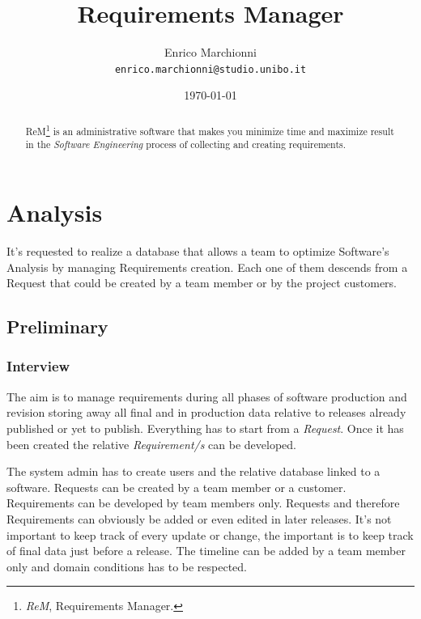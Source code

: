 \documentclass[12pt, a4paper]{report}
\title{
    Requirements Manager
}
\author{
    Enrico Marchionni\\
    \texttt{enrico.marchionni@studio.unibo.it}
}
\date{\today}
\begin{document}
\maketitle

\begin{abstract}

ReM\footnote{\emph{ReM}, Requirements Manager.} is an administrative software that makes you minimize time and maximize result in
the \emph{Software Engineering} process of collecting and creating requirements.

\end{abstract}

\tableofcontents

\chapter*{Analysis}
\label{chap:analysis}

It's requested to realize a database that allows a team to optimize Software's Analysis by managing Requirements creation.
Each one of them descends from a Request that could be created by a team member or by the project customers.

\section*{Preliminary}
\label{sec:preliminary}

\subsection*{Interview}
\label{subsec:interview}

The aim is to manage requirements during all phases of software production and revision storing away all final and in production
data relative to releases already published or yet to publish. Everything has to start from a \emph{Request}.
Once it has been created the relative \emph{Requirement/s} can be developed.

The system admin has to create users and the relative database linked to a software.
Requests can be created by a team member or a customer. Requirements can be developed by team members only. Requests and therefore
Requirements can obviously be added or even edited in later releases. It's not important to keep track of every update or change,
the important is to keep track of final data just before a release. The timeline can be added by a team member only and domain
conditions has to be respected.
\end{document}
